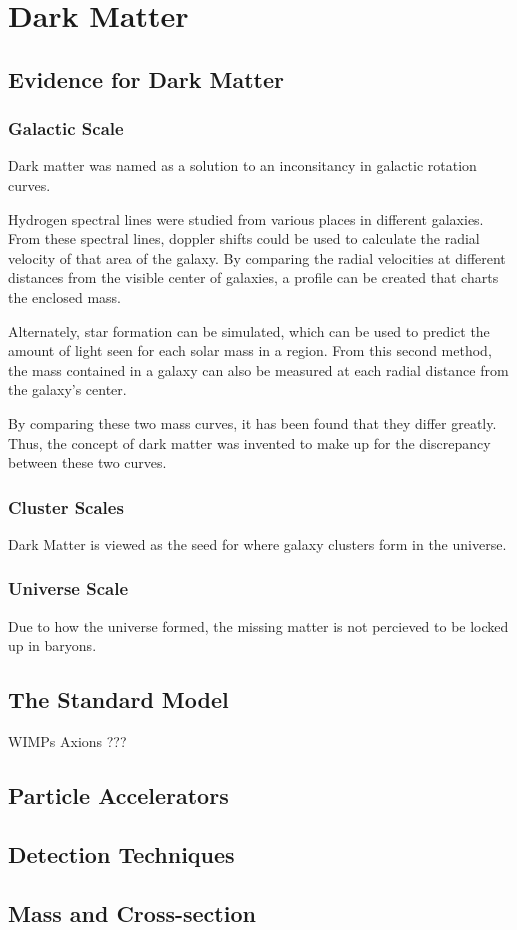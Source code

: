 \cleartooddpage[\thispagestyle{empty}]
\chapter{Dark Matter}

\section{Evidence for Dark Matter}

\subsection{Galactic Scale}

Dark matter was named as a solution to an inconsitancy in galactic rotation curves.

Hydrogen spectral lines were studied from various places in different galaxies.
From these spectral lines, doppler shifts could be used to calculate the radial velocity of that area of the galaxy.
By comparing the radial velocities at different distances from the visible center of galaxies, a profile can be created that charts the enclosed mass.

Alternately, star formation can be simulated, which can be used to predict the amount of light seen for each solar mass in a region.
From this second method, the mass contained in a galaxy can also be measured at each radial distance from the galaxy's center.

By comparing these two mass curves, it has been found that they differ greatly.
Thus, the concept of dark matter was invented to make up for the discrepancy between these two curves.



\subsection{Cluster Scales}

Dark Matter is viewed as the seed for where galaxy clusters form in the universe.

\subsection{Universe Scale}

Due to how the universe formed, the missing matter is not percieved to be locked up in baryons.


\section{The Standard Model}

WIMPs
Axions
???

\section{Particle Accelerators}


\section{Detection Techniques}


\section{Mass and Cross-section}


